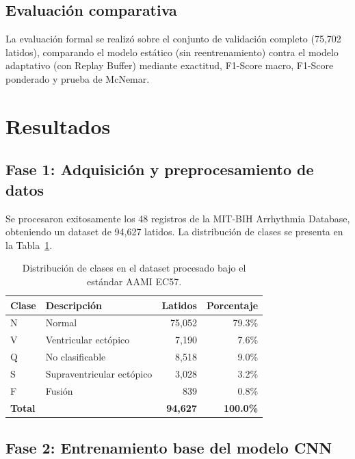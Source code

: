 \documentclass[11pt,spanish]{citedi}
\begin{document}
\subsection{Evaluación comparativa}

La evaluación formal se realizó sobre el conjunto de validación completo (75,702 latidos), comparando el modelo estático (sin reentrenamiento) contra el modelo adaptativo (con Replay Buffer) mediante exactitud, F1-Score macro, F1-Score ponderado y prueba de McNemar.

\section{Resultados}

\subsection{Fase 1: Adquisición y preprocesamiento de datos}

Se procesaron exitosamente los 48 registros de la MIT-BIH Arrhythmia Database, obteniendo un dataset de 94,627 latidos. La distribución de clases se presenta en la Tabla~\ref{T_distribucion}.

\begin{table}[h]
\caption{Distribución de clases en el dataset procesado bajo el estándar AAMI EC57.}
\label{T_distribucion}
\begin{center}
\begin{tabular}{llrr}
\toprule
\textbf{Clase} & \textbf{Descripción} & \textbf{Latidos} & \textbf{Porcentaje} \\
\midrule
N & Normal                    & 75,052 & 79.3\% \\
V & Ventricular ectópico      &  7,190 &  7.6\% \\
Q & No clasificable           &  8,518 &  9.0\% \\
S & Supraventricular ectópico &  3,028 &  3.2\% \\
F & Fusión                    &    839 &  0.8\% \\
\midrule
\textbf{Total} & & \textbf{94,627} & \textbf{100.0\%} \\
\bottomrule
\end{tabular}
\end{center}
\end{table}

\subsection{Fase 2: Entrenamiento base del modelo CNN}
\end{document}
